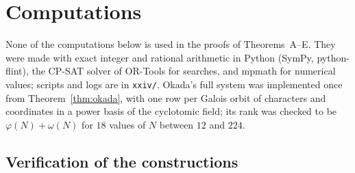 \documentclass[11pt,a4paper]{article}
\theoremstyle{definition}
\theoremstyle{remark}
\begin{document}
\section{Computations}\label{sec:computations}

None of the computations below is used in the proofs of Theorems~A--E. They were made with exact integer and rational arithmetic in Python (SymPy, python-flint), the CP-SAT solver of OR-Tools for searches, and mpmath for numerical values; scripts and logs are in \texttt{xxiv/}. Okada's full system was implemented once from Theorem~\ref{thm:okada}, with one row per Galois orbit of characters and coordinates in a power basis of the cyclotomic field; its rank was checked to be $\varphi(N)+\omega(N)$ for $18$ values of $N$ between $12$ and $224$.

\subsection{Verification of the constructions}
\end{document}
